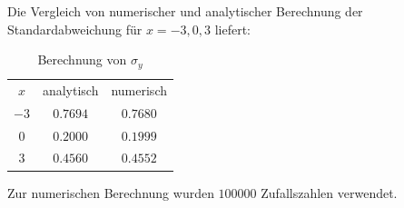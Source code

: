 \begin{itemize}
Die Vergleich von numerischer und analytischer Berechnung der Standardabweichung für $x = -3 , 0 , 3 $ liefert:
\begin{table}
\centering
\caption{Berechnung von $\sigma_y$}
\begin{tabular}{ccc}
$x$ & analytisch & numerisch \\
$-3$& $\num{0.7694}$ & $\num{0.7680}$ \\
$0$& $\num{0.2000}$ & $\num{0.1999}$ \\
$3$& $\num{0.4560}$ & $\num{0.4552}$ \\
\end{tabular}
\end{table}
Zur numerischen Berechnung wurden $\num{100000}$ Zufallszahlen verwendet.
\end{itemize}